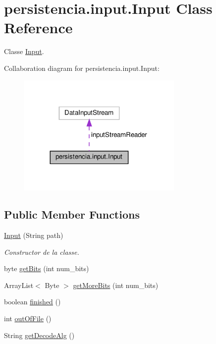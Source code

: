 \hypertarget{classpersistencia_1_1input_1_1Input}{}\section{persistencia.\+input.\+Input Class Reference}
\label{classpersistencia_1_1input_1_1Input}


Classe \hyperlink{classpersistencia_1_1input_1_1Input}{Input}.  




Collaboration diagram for persistencia.\+input.\+Input\+:
\nopagebreak
\begin{figure}[H]
\begin{center}
\leavevmode
\includegraphics[width=227pt]{classpersistencia_1_1input_1_1Input__coll__graph}
\end{center}
\end{figure}
\subsection*{Public Member Functions}
\begin{DoxyCompactItemize}
\item 
\hyperlink{classpersistencia_1_1input_1_1Input_a9b30ef8d489a1fc5b4aa04a14474349a}{Input} (String path)
\begin{DoxyCompactList}\small\item\em Constructor de la classe. \end{DoxyCompactList}\item 
byte \hyperlink{classpersistencia_1_1input_1_1Input_a3fa5a378b2155a3022a4a4ef38d63a8e}{get\+Bits} (int num\+\_\+bits)
\item 
Array\+List$<$ Byte $>$ \hyperlink{classpersistencia_1_1input_1_1Input_a81e96a5ac3ca41b5001ffff9f9acc76a}{get\+More\+Bits} (int num\+\_\+bits)
\item 
boolean \hyperlink{classpersistencia_1_1input_1_1Input_af607cad1726ef15cf8e970dcbee74b68}{finished} ()
\item 
int \hyperlink{classpersistencia_1_1input_1_1Input_a3f0fc057e91430b81f5f2c92f91b8ed7}{out\+Of\+File} ()
\item 
String \hyperlink{classpersistencia_1_1input_1_1Input_a95e2068bd17e415f0487f8193f066160}{get\+Decode\+Alg} ()
\end{DoxyCompactItemize}
